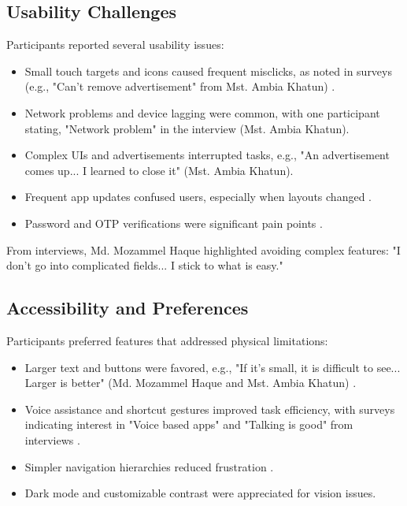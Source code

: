 \documentclass[acmlarge]{acmart}
\begin{document}
\subsection{Usability Challenges}
Participants reported several usability issues:
\begin{itemize}
    \item Small touch targets and icons caused frequent misclicks, as noted in surveys (e.g., "Can't remove advertisement" from Mst. Ambia Khatun) \cite{tanaka2020mobileux, hanson2010age}.
    \item Network problems and device lagging were common, with one participant stating, "Network problem" in the interview (Mst. Ambia Khatun).
    \item Complex UIs and advertisements interrupted tasks, e.g., "An advertisement comes up... I learned to close it" (Mst. Ambia Khatun).
    \item Frequent app updates confused users, especially when layouts changed \cite{peacock2020elderlyusage}.
    \item Password and OTP verifications were significant pain points \cite{johnson2022accessibility}.
\end{itemize}

From interviews, Md. Mozammel Haque highlighted avoiding complex features: "I don't go into complicated fields... I stick to what is easy."

\subsection{Accessibility and Preferences}
Participants preferred features that addressed physical limitations:
\begin{itemize}
    \item Larger text and buttons were favored, e.g., "If it's small, it is difficult to see... Larger is better" (Md. Mozammel Haque and Mst. Ambia Khatun) \cite{frank2018assistiveuse, zhao2020voiceassist}.
    \item Voice assistance and shortcut gestures improved task efficiency, with surveys indicating interest in "Voice based apps" and "Talking is good" from interviews \cite{smith2019voiceui, kalantari2021assistive}.
    \item Simpler navigation hierarchies reduced frustration \cite{bennett2020inclusive}.
    \item Dark mode and customizable contrast were appreciated for vision issues.
\end{itemize}
\end{document}

